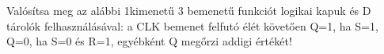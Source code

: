 \begin{example}

Valósítsa meg az alábbi 1kimenetű 3 bemenetű funkciót logikai kapuk és D tárolók felhasználásával: a CLK bemenet felfutó élét követően Q=1, ha S=1, Q=0, ha S=0 és R=1, egyébként Q megőrzi addigi értékét!

\tcbline
\vspace{1mm}

\solution

\end{example}